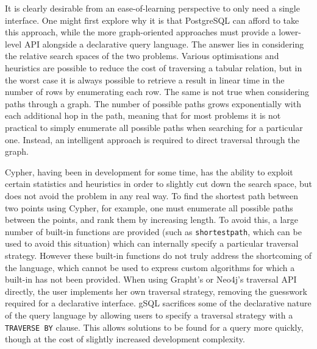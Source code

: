 It is clearly desirable from an ease-of-learning perspective to only need a
single interface. One might first explore why it is that PostgreSQL can afford
to take this approach, while the more graph-oriented approaches must provide a
lower-level API alongside a declarative query language. The answer lies in
considering the relative search spaces of the two problems. Various
optimisations and heuristics are possible to reduce the cost of traversing a
tabular relation, but in the worst case it is always possible to retrieve a
result in linear time in the number of rows by enumerating each row. The same
is not true when considering paths through a graph. The number of possible
paths grows exponentially with each additional hop in the path, meaning that
for most problems it is not practical to simply enumerate all possible paths
when searching for a particular one. Instead, an intelligent approach is required
to direct traversal through the graph. 

Cypher, having been in development for some time, has the ability to exploit
certain statistics and heuristics in order to slightly cut down the search
space, but does not avoid the problem in any real way. To find the shortest
path between two points using Cypher, for example, one must enumerate all
possible paths between the points, and rank them by increasing length. To
avoid this, a large number of built-in functions are provided (such as
\texttt{shortestpath}, which can be used to avoid this situation) which can
internally specify a particular traversal strategy. However these built-in
functions do not truly address the shortcoming of the language, which cannot
be used to express custom algorithms for which a built-in has not been
provided. When using Grapht's or Neo4j's traversal API directly, the user
implements her own traversal  strategy, removing the guesswork required for a
declarative interface. gSQL sacrifices some of the declarative nature of the
query language by allowing users to specify a traversal strategy with a
\texttt{TRAVERSE BY} clause. This allows solutions to be found for a query
more quickly, though at the cost of slightly increased development complexity.

